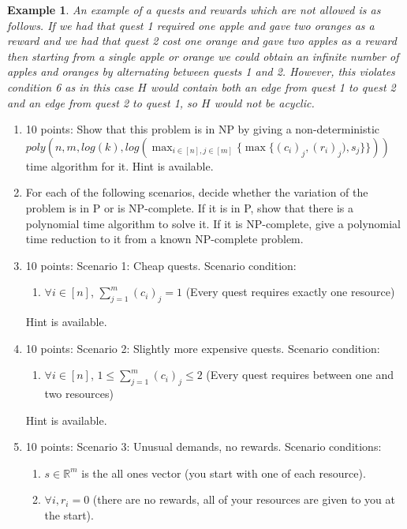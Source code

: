 \documentclass[12pt]{article}
\newtheorem{example}[theorem]{Example}
\begin{document}
\begin{example}
An example of a quests and rewards which are not allowed is as follows. If we had that quest 1 required one apple and gave two oranges as a reward and we had that quest 2 cost one orange and gave two apples as a reward then starting from a single apple or orange we could obtain an infinite number of apples and oranges by alternating between quests 1 and 2. However, this violates condition 6 as in this case $H$ would contain both an edge from quest 1 to quest 2 and an edge from quest 2 to quest 1, so $H$ would not be acyclic. 
\end{example}
\begin{enumerate}
\item[(a)] 10 points: Show that this problem is in NP by giving a non-deterministic \\ $poly(n,m,log(k),log(\max_{i \in [n],j \in [m]}{\{\max\{(c_i)_j, (r_i)_j), s_j\}\}}))$ time algorithm for it. Hint is available. %
\item[Parts b-f:] For each of the following scenarios, decide whether the variation of the problem is in P or is NP-complete. If it is in P, show that there is a polynomial time algorithm to solve it. If it is NP-complete, give a polynomial time reduction to it from a known NP-complete problem.
\item[(b)] 10 points: Scenario 1: Cheap quests. Scenario condition:
\begin{enumerate}
\item[1.] $\forall i \in [n]$, $\sum_{j=1}^{m}{(c_i)_j} = 1$ (Every quest requires exactly one resource)
\end{enumerate}
Hint is available.
\item[(c)] 10 points: Scenario 2: Slightly more expensive quests. Scenario condition:
\begin{enumerate}
\item[1.] $\forall i \in [n]$, $1 \leq \sum_{j=1}^{m}{(c_i)_j} \leq 2$ (Every quest requires between one and two resources)
\end{enumerate}
Hint is available.
\item[(d)] 10 points: Scenario 3: Unusual demands, no rewards. Scenario conditions:
\begin{enumerate}
\item[1.] $s \in \mathbb{R}^m$ is the all ones vector (you start with one of each resource).
\item[2.] $\forall i, r_i = 0$ (there are no rewards, all of your resources are given to you at the start).

\end{enumerate}
\end{enumerate}
\end{document}
